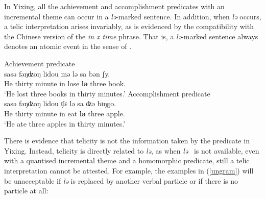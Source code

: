 \documentclass[output=paper]{langsci/langscibook}
\begin{document}
In Yixing, all the achievement and accomplishment predicates with an
incremental theme can occur in a \emph{lə}-marked sentence. In addition, when
\emph{lə} occurs, a telic interpretation arises invariably, as is evidenced by
the compatibility with the Chinese version of the \emph{in x time} phrase. That
is, a \emph{lə}-marked sentence always denotes an atomic event in the sense of
\textcite{Rothstein2004}.

\begin{exe}
\ex Achievement predicate\\
   \label{achievement predicate}  {sasə} {fəŋʣoŋ} lidou {mə} {lə} sa bən ʃy. \\
    He thirty minute in lose \textbf{lə} three \Clf{} book. \\
    \glt \enquote*{He lost three books in thirty minutes.}
\ex Accomplishment predicate\\
   \label{accomplishment predicate}  {sasə} {fəŋʣoŋ} lidou {ʧε} {lə} sa {ʣə} bɪŋgo. \\
    He thirty minute in eat \textbf{lə} three \Clf{} apple. \\
    \glt \enquote*{He ate three apples in thirty minutes.}
\end{exe}

There is evidence that telicity is not the information taken by the predicate
in Yixing. Instead, telicity is directly related to \emph{lə}, as when
\emph{lə} \ is not available, even with a quantised incremental theme and a
homomorphic predicate, still a telic interpretation cannot be attested. For
example, the examples in (\ref{ungram}) will be unacceptable if
\emph{lə} is replaced by another verbal particle or if there is no particle at
all:

\begin{exe}
    \ex\label{ungram} 
    \begin{xlist}
    \end{xlist}
\end{exe}
\end{document}
